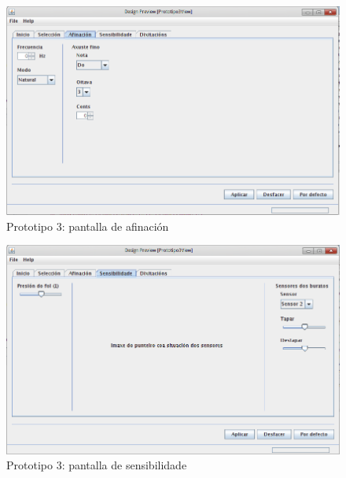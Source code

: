   \begin{figure}[htbp]
   \centering
   \includegraphics[scale=0.6,keepaspectratio=true]{./imagenes/prototipo3-3.png}
   \caption{Prototipo 3: pantalla de afinación}
   \label{figura:Prototipo3Afinacion}
  \end{figure}

  \begin{figure}[htbp]
   \centering
   \includegraphics[scale=0.6,keepaspectratio=true]{./imagenes/prototipo3-4.png}
   \caption{Prototipo 3: pantalla de sensibilidade}
   \label{figura:Prototipo3Sensibilidade}
  \end{figure}

